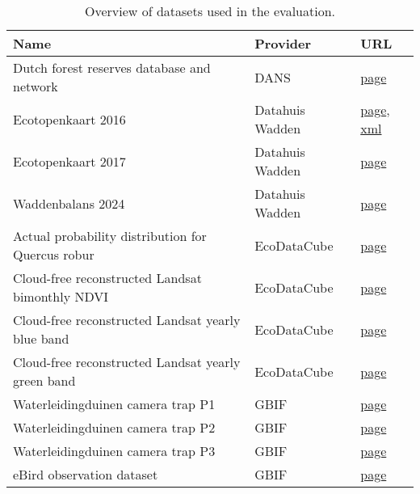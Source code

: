 \begin{table}
\caption{Overview of datasets used in the evaluation.}
\label{tab:dataset_overview}
\begin{tabular}{lll}
\toprule
Name & Provider & URL \\
\midrule
Dutch forest reserves database and network & DANS & \href{https://lifesciences.datastations.nl/dataset.xhtml?persistentId=doi:10.17026/dans-2bd-kskz}{page} \\
Ecotopenkaart 2016 & Datahuis Wadden & \href{https://datahuiswadden.openearth.nl/geonetwork/srv/api/records/A0h06_NlSEuNlium5OO3FA}{page}, \href{https://datahuiswadden.openearth.nl/geonetwork/srv/api/records/A0h06_NlSEuNlium5OO3FA/formatters/xml}{xml} \\
Ecotopenkaart 2017 & Datahuis Wadden & \href{https://datahuiswadden.openearth.nl/geonetwork/srv/eng/catalog.search#/metadata/L-mHomzGRuKAHGMkUPjY9g}{page} \\
Waddenbalans 2024 & Datahuis Wadden & \href{https://datahuiswadden.openearth.nl/geonetwork/srv/eng/catalog.search#/metadata/0fe7e64b-50b3-4cee-b64a-02659fc2b6c7}{page} \\
Actual probability distribution for Quercus robur & EcoDataCube & \href{https://stac.ecodatacube.eu/veg_quercus.robur_anv.eml/collection.json?.language=en}{page} \\
Cloud-free reconstructed Landsat bimonthly NDVI & EcoDataCube & \href{https://stac.ecodatacube.eu/ndvi_glad.landsat.ard2.seasconv/collection.json?.language=en}{page} \\
Cloud-free reconstructed Landsat yearly blue band & EcoDataCube & \href{https://stac.ecodatacube.eu/blue_glad.landsat.ard2.seasconv.m.yearly/collection.json}{page} \\
Cloud-free reconstructed Landsat yearly green band & EcoDataCube & \href{https://stac.ecodatacube.eu/green_glad.landsat.ard2.seasconv.m.yearly/collection.json}{page} \\
Waterleidingduinen camera trap P1 & GBIF & \href{https://www.gbif.org/dataset/74196cd9-7ebc-4b20-bc27-3c2d22e31ed7}{page} \\
Waterleidingduinen camera trap P2 & GBIF & \href{https://www.gbif.org/dataset/f9ba3c2e-0636-4f66-a4b5-b8c138046e9e}{page} \\
Waterleidingduinen camera trap P3 & GBIF & \href{https://www.gbif.org/dataset/bc0acb9a-131f-4085-93ae-a46e08564ac5}{page} \\
eBird observation dataset & GBIF & \href{https://www.gbif.org/dataset/4fa7b334-ce0d-4e88-aaae-2e0c138d049e}{page} \\

\end{tabular}
\end{table}
